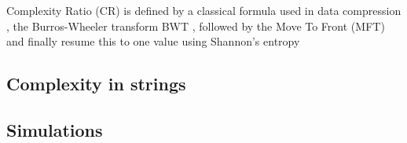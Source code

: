 Complexity Ratio (CR) is defined by a classical formula used in data compression \cite{Adjeroh2008}, the Burros-Wheeler transform BWT \cite{Burrows1994}, followed by the Move To Front (MFT) \cite{Ryabko1980} and finally resume this to one value using Shannon's entropy \cite{Shannon1948}


\subsection{Complexity in strings}

\subsection{Simulations}
